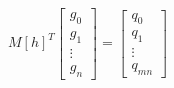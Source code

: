 \documentclass[preview]{standalone}
\begin{document}
\begin{align*}
M[h]^T \begin{bmatrix} g_0 \\ g_1 \\ \vdots \\ g_n \end{bmatrix} = \begin{bmatrix} q_0 \\ q_1 \\ \vdots \\ q_{mn} \end{bmatrix}
\end{align*}
\end{document}
